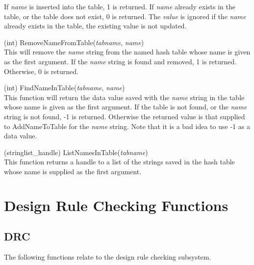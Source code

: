 \begin{description}
If {\it name} is inserted into the table, 1 is returned.  If {\it
name} already exists in the table, or the table does not exist, 0 is
returned.  The {\it value} is ignored if the {\it name} already exists
in the table, the existing value is not updated.

\item{(int) \vt RemoveNameFromTable({\it tabname\/}, {\it name\/})}\\
This will remove the {\it name} string from the named hash table whose
name is given as the first argument.  If the {\it name} string is
found and removed, 1 is returned.  Otherwise, 0 is returned.

\item{(int) \vt FindNameInTable({\it tabname\/}, {\it name\/})}\\
This function will return the data value saved with the {\it name}
string in the table whose name is given as the first argument.  If the
table is not found, or the {\it name} string is not found, -1 is
returned.  Otherwise the returned value is that supplied to {\vt
AddNameToTable} for the {\it name} string.  Note that it is a bad
idea to use -1 as a data value.

\item{(stringlist\_handle) \vt ListNamesInTable({\it tabname\/})}\\
This function returns a handle to a list of the strings saved in the
hash table whose name is supplied as the first argument.
\end{description}


\section{Design Rule Checking Functions}
\subsection{DRC}

The following functions relate to the design rule checking subsystem.

